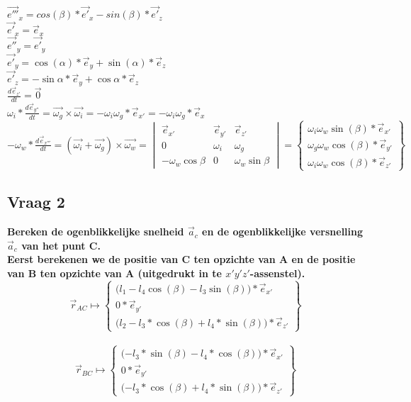 \documentclass[a4paper,10pt]{article}
\begin{document}
\begin{center}
	$\vec{e'''}_{x} = cos(\beta) *\vec{e'}_{x} - sin(\beta) *\vec{e'}_{z}$\\
	$\vec{e'}_{x}=\vec{e}_{x}$\\
	$\vec{e''}_{y} = \vec{e'}_{y} $\\
	$\vec{e'}_{y} = \cos(\alpha)*\vec{e}_{y} + \sin(\alpha)*\vec{e}_z $\\
	$\vec{e'}_{z} = -\sin{\alpha}*\vec{e}_{y} + \cos{\alpha}*\vec{e}_z $\\
	$\frac{d\vec{e}_{z'}}{dt}=\vec{0}$\\
	$\omega_i * \frac{d\vec{e}_{y''}}{dt}=\vec{\omega_g}\times\vec{\omega_i} = -\omega_i \omega_g *\vec{e}_{x'} = -\omega_i \omega_g *\vec{e}_{x}  $\\
	$-\omega_w * \frac{d\vec{e}_{x'''}}{dt} = (\vec{\omega_i} + \vec{\omega_g})\times\vec{\omega_w} = \begin{vmatrix}
	\vec{e}_{x'}&\vec{e}_{y'}&\vec{e}_{z'}\\
	0 & \omega_i & \omega_g\\
	-\omega_w \cos{\beta} & 0 & \omega_w \sin{\beta}
	\end{vmatrix} = \begin{Bmatrix}
	\omega_i \omega_w \sin(\beta)  *\vec{e}_{x'} \\
	\omega_g \omega_w \cos(\beta) *\vec{e}_{y'}\\
	\omega_i \omega_w \cos(\beta) *\vec{e}_{z'}
	\end{Bmatrix}
	$
\end{center}
\subsection{Vraag 2}
\textbf{Bereken de ogenblikkelijke snelheid $\vec{a}_c$ en de ogenblikkelijke versnelling $\vec{a}_c$ van het punt C.}\\
\textbf{Eerst berekenen we de positie van C ten opzichte van A en de positie van B ten opzichte van A (uitgedrukt in te $x'y'z'$-assenstel).}
\begin{equation}
	\vec{r}_{AC} \mapsto \begin{Bmatrix}
		\Big({l_1 - l_4 \cos(\beta)-l_3 \sin(\beta)\Big)*\vec{e}_{x'}}\\
		0 * \vec{e}_{y'}\\
		\Big ({l_2 - l_3*\cos(\beta) + l_4 *\sin(\beta)\Big) * \vec{e}_{z'}}
	\end{Bmatrix}
\end{equation}\\
\begin{equation}
	\vec{r}_{BC} \mapsto \begin{Bmatrix}
		\Big({ - l_3 * \sin(\beta) - l_4 * \cos(\beta)\Big)*\vec{e}_{x'}}\\
		0 * \vec{e}_{y'}\\
		\Big ({ - l_3*\cos(\beta) + l_4 *\sin(\beta)\Big) * \vec{e}_{z'}}
	\end{Bmatrix}
\end{equation}\\
\end{document}
